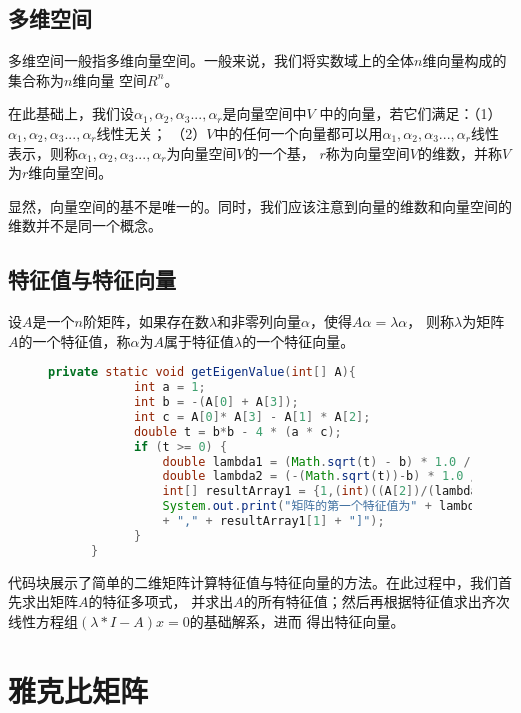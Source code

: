 \subsection{多维空间}

多维空间一般指多维向量空间。一般来说，我们将实数域上的全体$n$维向量构成的集合称为$n$维向量
空间$R^n$。

在此基础上，我们设$\alpha_{1},\alpha_{2},\alpha_{3}...,\alpha_{r}$是向量空间中$V$
中的向量，若它们满足：（1）$\alpha_{1},\alpha_{2},\alpha_{3}...,\alpha_{r}$线性无关；
（2）$V$中的任何一个向量都可以用$\alpha_{1},\alpha_{2},\alpha_{3}...,\alpha_{r}$线性
表示，则称$\alpha_{1},\alpha_{2},\alpha_{3}...,\alpha_{r}$为向量空间$V$的一个基，
$r$称为向量空间$V$的维数，并称$V$为$r$维向量空间。

显然，向量空间的基不是唯一的。同时，我们应该注意到向量的维数和向量空间的维数并不是同一个概念。




\subsection{特征值与特征向量}

设$A$是一个$n$阶矩阵，如果存在数$\lambda$和非零列向量$\alpha$，使得$A\alpha=\lambda\alpha$，
则称$\lambda$为矩阵$A$的一个特征值，称$\alpha$为$A$属于特征值$\lambda$的一个特征向量。

\vspace{5pt}

\begin{figure}[!ht]
	\begin{lstlisting}[language=Java]
		private static void getEigenValue(int[] A){
			int a = 1;
			int b = -(A[0] + A[3]);
			int c = A[0]* A[3] - A[1] * A[2];
			double t = b*b - 4 * (a * c);
			if (t >= 0) {
				double lambda1 = (Math.sqrt(t) - b) * 1.0 / (2 * a);
				double lambda2 = (-(Math.sqrt(t))-b) * 1.0 / (2 * a);
				int[] resultArray1 = {1,(int)((A[2])/(lambda1 - A[3]))};
				System.out.print("矩阵的第一个特征值为" + lambda1 + ",特征向量为" + "[" + resultArray1[0] 
				+ "," + resultArray1[1] + "]");
			}
	  }
	\end{lstlisting}
\end{figure}

代码块展示了简单的二维矩阵计算特征值与特征向量的方法。在此过程中，我们首先求出矩阵$A$的特征多项式，
并求出$A$的所有特征值；然后再根据特征值求出齐次线性方程组$(\lambda*I-A)x=0$的基础解系，进而
得出特征向量。

\section{雅克比矩阵}

